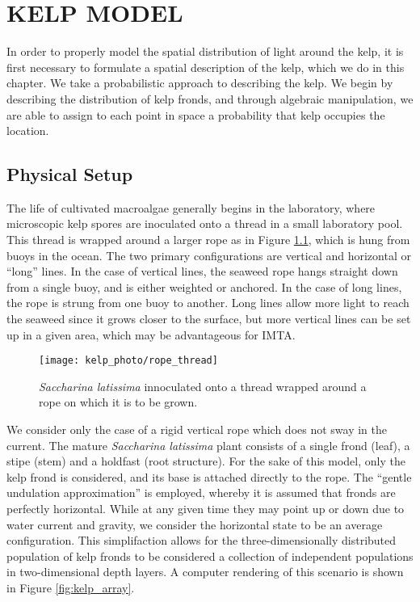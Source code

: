 \chapter{KELP MODEL}
\label{chap:kelp}

In order to properly model the spatial distribution of light around the kelp, it is first necessary to formulate a spatial description of the kelp, which we do in this chapter.
We take a probabilistic approach to describing the kelp.
We begin by describing the distribution of kelp fronds, and through algebraic manipulation, we are able to assign to each point in space a probability that kelp occupies the location.


\section{Physical Setup}
The life of cultivated macroalgae generally begins in the laboratory, where microscopic kelp spores are inoculated onto a thread in a small laboratory pool.
This thread is wrapped around a larger rope as in Figure \ref{fig:rope_thread}, which is hung from buoys in the ocean.
The two primary configurations are vertical and horizontal or ``long'' lines.
In the case of vertical lines, the seaweed rope hangs straight down from a single buoy, and is either weighted or anchored.
In the case of long lines, the rope is strung from one buoy to another.
Long lines allow more light to reach the seaweed since it grows closer to the surface, but more vertical lines can be set up in a given area,
which may be advantageous for IMTA.

\begin{figure}[H]
  \centering
  \texttt{[image: kelp\_photo/rope\_thread]}
  \caption{\textit{Saccharina latissima} innoculated onto a thread wrapped around a rope on which it is to be grown.}
  \label{fig:rope_thread}
\end{figure}

We consider only the case of a rigid vertical rope which does not sway in the current.
The mature \textit{Saccharina latissima} plant consists of a single frond (leaf), a stipe (stem) and a holdfast (root structure).
For the sake of this model, only the kelp frond is considered, and its base is attached directly to the rope.
The ``gentle undulation approximation'' is employed, whereby it is assumed that fronds are perfectly horizontal.
While at any given time they may point up or down due to water current and gravity, we consider the horizontal
state to be an average configuration.
This simplifaction allows for the three-dimensionally distributed population of kelp fronds
to be considered a collection of independent populations in two-dimensional depth layers.
A computer rendering of this scenario is shown in Figure \ref{fig:kelp_array}.

